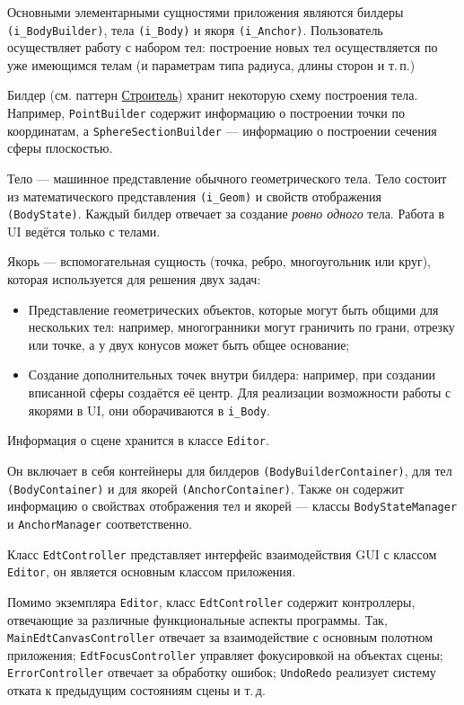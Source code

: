\documentclass[fontsize=10px, a4paper, openany]{scrbook}
\begin{document}
Основными элементарными сущностями приложения являются билдеры \texttt{(i\_BodyBuilder)}, тела \texttt{(i\_Body)} и якоря \texttt{(i\_Anchor)}. Пользователь осуществляет работу с набором тел: построение новых тел осуществляется по уже имеющимся телам (и параметрам типа радиуса, длины сторон и т.\,п.)

Билдер (см. паттерн \href{https://ru.wikipedia.org/wiki/\%D0\%A1\%D1\%82\%D1\%80\%D0\%BE\%D0\%B8\%D1\%82\%D0\%B5\%D0\%BB\%D1\%8C_(\%D1\%88\%D0\%B0\%D0\%B1\%D0\%BB\%D0\%BE\%D0\%BD_\%D0\%BF\%D1\%80\%D0\%BE\%D0\%B5\%D0\%BA\%D1\%82\%D0\%B8\%D1\%80\%D0\%BE\%D0\%B2\%D0\%B0\%D0\%BD\%D0\%B8\%D1\%8F)}{Строитель}) хранит некоторую схему построения тела. Например, \texttt{PointBuilder} содержит информацию о построении точки по координатам, а \texttt{SphereSectionBuilder} --- информацию о построении сечения сферы плоскостью.

Тело --- машинное представление обычного геометрического тела. Тело состоит из математического представления \texttt{(i\_Geom)} и свойств отображения \texttt{(BodyState)}. Каждый билдер отвечает за создание \textit{ровно одного} тела. Работа в UI ведётся только с телами.

Якорь --- вспомогательная сущность (точка, ребро, многоугольник или круг), которая используется для решения двух задач:
\begin{itemize}
	\item Представление геометрических объектов, которые могут быть общими для нескольких тел: например, многогранники могут граничить по грани, отрезку или точке, а у двух конусов может быть общее основание;
	\item Создание дополнительных точек внутри билдера: например, при создании вписанной сферы создаётся её центр. Для реализации возможности работы с якорями в UI, они оборачиваются в \texttt{i\_Body}.
\end{itemize}

Информация о сцене хранится в классе \texttt{Editor}.

Он включает в себя контейнеры для билдеров \texttt{(BodyBuilderContainer)}, для тел \texttt{(BodyContainer)} и для якорей \texttt{(AnchorContainer)}. Также он содержит информацию о свойствах отображения тел и якорей --- классы \texttt{BodyStateManager} и \texttt{AnchorManager} соответственно.

Класс \texttt{EdtController} представляет интерфейс взаимодействия GUI с классом \texttt{Editor}, он является основным классом приложения.

Помимо экземпляра \texttt{Editor}, класс \texttt{EdtController} содержит контроллеры, отвечающие за различные функциональные аспекты программы. Так, \texttt{MainEdtCanvasController} отвечает за взаимодействие с основным полотном приложения; \texttt{EdtFocusController} управляет фокусировкой на объектах сцены; \texttt{ErrorController} отвечает за обработку ошибок; \texttt{UndoRedo} реализует систему отката к предыдущим состояниям сцены и т.\,д.
\end{document}
